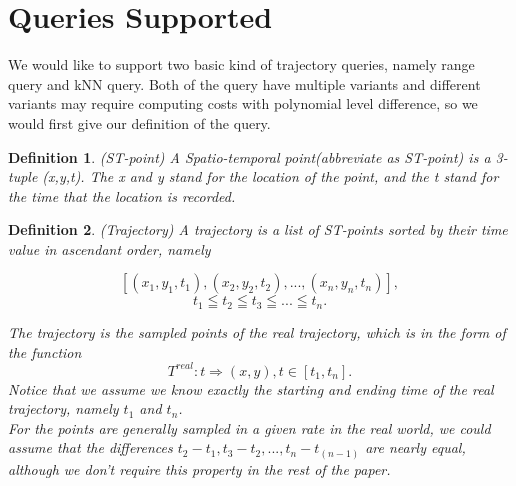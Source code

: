 \documentclass[sigplan]{acmart}
\newtheorem{myDef}{Definition}
\begin{document}
\section{Queries Supported}
We would like to support two basic kind of trajectory queries, namely range query and kNN query. Both of the query have multiple variants and different variants may require computing costs with polynomial level difference, so we would first give our definition of the query. \par
\begin{myDef}
  (ST-point) A Spatio-temporal point(abbreviate as ST-point) is a 3-tuple (x,y,t). The x and y stand for the location of the point, and the t stand for the time that the location is recorded.
\end{myDef}
\begin{myDef}
  (Trajectory) A trajectory is a list of ST-points sorted by their time value in ascendant order, namely

     $$[(x_1,y_1,t_1),(x_2,y_2,t_2),...,(x_n,y_n,t_n)], $$
     $$t_1 \leqq t_2 \leqq t_3 \leqq ... \leqq t_n .$$

   The trajectory is the sampled points of the real trajectory, which is in the form of the function
   $$T^{real}: t \Rightarrow (x,y), t\in [t_1,t_n].$$
   Notice that we assume we know exactly the starting and ending time of the real trajectory, namely $t_1$ and $t_n$.\\
   For the points are generally sampled in a given rate in the real world, we could assume that the differences $t_2-t_1, t_3-t_2, ... , t_n- t_(n-1)$ are nearly equal, although we don't require this property in the rest of the paper.
\end{myDef}
\end{document}
